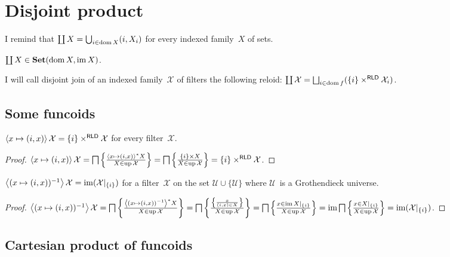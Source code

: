 \chapter{Disjoint product}

I remind that
$\coprod X = \bigcup_{i\in\operatorname{dom} X} (i,X_i)$
for every indexed family~$X$ of sets.

\begin{obvious}
$\coprod X\in\mathbf{Set}(\operatorname{dom} X,\operatorname{im} X)$.
\end{obvious}

\begin{defn}
I will call disjoint join of an indexed family~$\mathcal{X}$ of filters the following reloid: $\coprod\mathcal{X} = \bigsqcup_{i\in\dom f}(\{i\}\times^{\mathsf{RLD}}\mathcal{X}_i)$.
\end{defn}

\section{Some funcoids}

\begin{prop}
$\left\langle x\mapsto(i,x)\right\rangle\mathcal{X}=\{i\}\times^{\mathsf{RLD}}\mathcal{X}$ for every filter~$\mathcal{X}$.
\end{prop}

\begin{proof}
$\left\langle x\mapsto(i,x)\right\rangle\mathcal{X}=\bigsqcap\left\{ \frac{\left\langle x\mapsto(i,x)\right\rangle ^{\ast}X}{X\in\operatorname{up}\mathcal{X}}\right\}=\bigsqcap\left\{ \frac{\{i\}\times X}{X\in\operatorname{up}\mathcal{X}}\right\}=\{i\}\times^{\mathsf{RLD}}\mathcal{X}$.
\end{proof}

\begin{prop}
$\left\langle (x\mapsto(i,x))^{-1}\right\rangle\mathcal{X}=\operatorname{im}(\mathcal{X}|_{\{i\}})$ for a filter~$\mathcal{X}$ on the set $\mathscr{U}\cup\{{\mathscr{U}}\}$ where $\mathscr{U}$~is
a Grothendieck universe.
\end{prop}

\begin{proof}
$\left\langle (x\mapsto(i,x))^{-1}\right\rangle\mathcal{X}=\bigsqcap\left\{ \frac{\left\langle (x\mapsto(i,x))^{-1}\right\rangle ^{\ast}X}{X\in\operatorname{up}\mathcal{X}}\right\}=\bigsqcap\left\{ \frac{\left\{ \frac{x}{(i,x)\in X}\right\}}{X\in\operatorname{up}\mathcal{X}}\right\}=\bigsqcap\left\{ \frac{x\in\operatorname{im} X|_{\{i\}}}{X\in\operatorname{up}\mathcal{X}}\right\}=\operatorname{im}\bigsqcap\left\{ \frac{x\in X|_{\{i\}}}{X\in\operatorname{up}\mathcal{X}}\right\}=\operatorname{im}(\mathcal{X}|_{\{i\}})$.
\end{proof}

\section{Cartesian product of funcoids}


